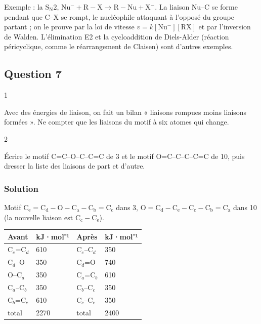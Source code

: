 \documentclass[11pt,a4paper]{article}
\begin{document}
Exemple : la \textbf{\(\mathrm{S_N2}\)}, \(\mathrm{Nu^-}+\mathrm{R{-}X}\to\mathrm{R{-}Nu}+\mathrm{X^-}\). La liaison Nu--C se forme pendant que C--X se rompt, le nucléophile attaquant à l'opposé du groupe partant ; on le prouve par la loi de vitesse \(v=k[\mathrm{Nu^-}][\mathrm{RX}]\) et par l'inversion de Walden. L'élimination E2 et la cycloaddition de Diels-Alder (réaction péricyclique, comme le réarrangement de Claisen) sont d'autres exemples.

\hypertarget{question-7}{%
\subsection{Question 7}\label{question-7}}

\begin{indication}{1}

Avec des énergies de liaison, on fait un bilan « liaisons rompues moins liaisons formées ». Ne compter que les liaisons du motif à six atomes qui change.

\end{indication}

\begin{indication}{2}

Écrire le motif C=C--O--C--C=C de 3 et le motif O=C--C--C--C=C de 10, puis dresser la liste des liaisons de part et d'autre.

\end{indication}

\hypertarget{solution-6}{%
\subsubsection{Solution}\label{solution-6}}

Motif \(\mathrm{C_e{=}C_d{-}O{-}C_a{-}C_b{=}C_c}\) dans 3, \(\mathrm{O{=}C_d{-}C_e{-}C_c{-}C_b{=}C_a}\) dans 10 (la nouvelle liaison est \(\mathrm{C_c{-}C_e}\)).

\begin{longtable}[]{@{}llll@{}}
\toprule\noalign{}
Avant & kJ·mol⁻¹ & Après & kJ·mol⁻¹ \\
\midrule\noalign{}
\endhead
\bottomrule\noalign{}
\endlastfoot
C\(_e\)=C\(_d\) & 610 & C\(_e\)--C\(_d\) & 350 \\
C\(_d\)--O & 350 & C\(_d\)=O & 740 \\
O--C\(_a\) & 350 & C\(_a\)=C\(_b\) & 610 \\
C\(_a\)--C\(_b\) & 350 & C\(_b\)--C\(_c\) & 350 \\
C\(_b\)=C\(_c\) & 610 & C\(_c\)--C\(_e\) & 350 \\
total & 2270 & total & 2400 \\
\end{longtable}
\end{document}
